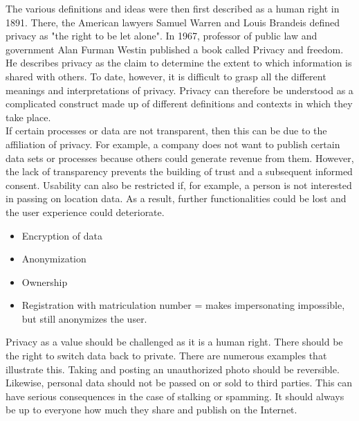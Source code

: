 The various definitions and ideas were then first described as a human right in 1891\cite{history-of-privacy}.
There, the American lawyers Samuel Warren and Louis Brandeis defined privacy as "the right to be let alone".
In 1967, professor of public law and government Alan Furman Westin published a book called Privacy and freedom\cite{privacy-and-freedom}.
He describes privacy as the claim to determine the extent to which information is shared with others.
To date, however, it is difficult to grasp all the different meanings and interpretations of privacy.
Privacy can therefore be understood as a complicated construct made up of different definitions and contexts in which they take place.\\

If certain processes or data are not transparent, then this can be due to the affiliation of privacy.
For example, a company does not want to publish certain data sets or processes because others could generate revenue from them.
However, the lack of transparency prevents the building of trust and a subsequent informed consent.
Usability can also be restricted if, for example, a person is not interested in passing on location data.
As a result, further functionalities could be lost and the user experience could deteriorate.

\begin{itemize}
    \item Encryption of data
    \item Anonymization
    \item Ownership
    \item Registration with matriculation number = makes impersonating impossible, but still anonymizes the user.
\end{itemize}

Privacy as a value should be challenged as it is a human right.
There should be the right to switch data back to private.
There are numerous examples that illustrate this.
Taking and posting an unauthorized photo should be reversible.
Likewise, personal data should not be passed on or sold to third parties.
This can have serious consequences in the case of stalking or spamming.
It should always be up to everyone how much they share and publish on the Internet.

